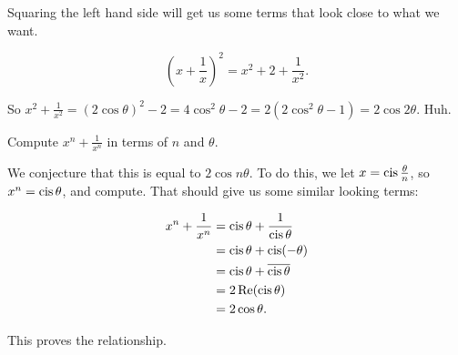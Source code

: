 \documentclass[../key.tex]{subfiles}
\begin{document}
Squaring the left hand side will get us some terms that look close to what we want.

$$\left(x + \frac{1}{x}\right)^2 = x^2 + 2 + \frac{1}{x^2}.$$

So $x^2 + \frac{1}{x^2} = (2\cos\theta)^2 - 2 = 4\cos^2\theta - 2 = 2 (2\cos^2\theta - 1) = 2\cos 2\theta$. Huh.

\begin{inner_problem}
\item Compute $x^n+\frac{1}{x^n}$ in terms of $n$ and $\theta$.
\end{inner_problem}

We conjecture that this is equal to $2\cos n\theta$. To do this, we let $x=\operatorname{cis} \frac{\theta}{n}$, so $x^n = \operatorname{cis}\theta$, and compute. That should give us some similar looking terms:

\begin{align*}
x^n + \frac{1}{x^n} &= \operatorname{cis} \theta + \frac{1}{\operatorname{cis} \theta} \\
&= \operatorname{cis}\theta + \operatorname{cis} (-\theta) \\
&= \operatorname{cis}\theta + \overline{\operatorname{cis}\theta} \\
&= 2 \operatorname{Re}(\operatorname{cis} \theta) \\
&= 2 \cos\theta.
\end{align*}

This proves the relationship.
\end{document}
